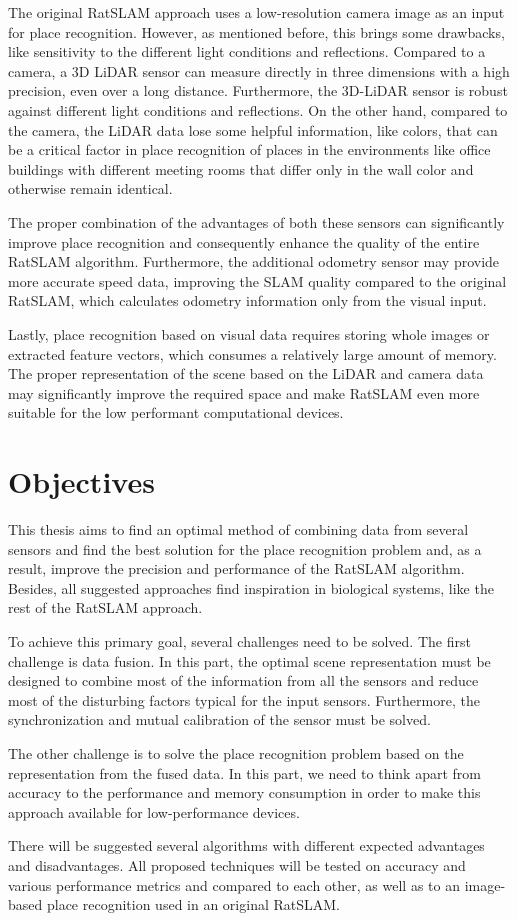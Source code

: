 The original RatSLAM approach uses a low-resolution camera image as an input for place recognition. However, as mentioned before, this brings some drawbacks, like sensitivity to the different light conditions and reflections. Compared to a camera, a 3D LiDAR sensor can measure directly in three dimensions with a high precision, even over a long distance. Furthermore, the 3D-LiDAR sensor is robust against different light conditions and reflections. On the other hand, compared to the camera, the LiDAR data lose some helpful information, like colors, that can be a critical factor in place recognition of places in the environments like office buildings with different meeting rooms that differ only in the wall color and otherwise remain identical.\par
The proper combination of the advantages of both these sensors can significantly improve place recognition and consequently enhance the quality of the entire RatSLAM algorithm. Furthermore, the additional odometry sensor may provide more accurate speed data, improving the SLAM quality compared to the original RatSLAM, which calculates odometry information only from the visual input.\par
Lastly, place recognition based on visual data requires storing whole images or extracted feature vectors, which consumes a relatively large amount of memory. The proper representation of the scene based on the LiDAR and camera data may significantly improve the required space and make RatSLAM even more suitable for the low performant computational devices.

\section{Objectives}\label{section:objectives}

This thesis aims to find an optimal method of combining data from several sensors and find the best solution for the place recognition problem and, as a result, improve the precision and performance of the RatSLAM algorithm. Besides, all suggested approaches find inspiration in biological systems, like the rest of the RatSLAM approach.\par
To achieve this primary goal, several challenges need to be solved. The first challenge is data fusion. In this part, the optimal scene representation must be designed to combine most of the information from all the sensors and reduce most of the disturbing factors typical for the input sensors. Furthermore, the synchronization and mutual calibration of the sensor must be solved.\par
The other challenge is to solve the place recognition problem based on the representation from the fused data. In this part, we need to think apart from accuracy to the performance and memory consumption in order to make this approach available for low-performance devices.\par
There will be suggested several algorithms with different expected advantages and disadvantages. All proposed techniques will be tested on accuracy and various performance metrics and compared to each other, as well as to an image-based place recognition used in an original RatSLAM.

